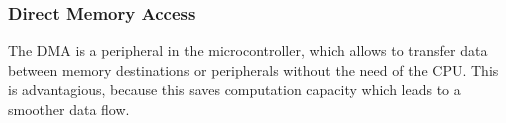 \subsubsection{Direct Memory Access}


The \ac{DMA} is a peripheral in the microcontroller, which allows to transfer data between memory destinations or
peripherals without the need of the \ac{CPU}.
This is advantagious, because this saves computation capacity which leads to a smoother data flow.
